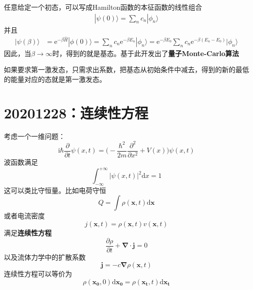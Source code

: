 \documentclass[12pt]{article}
\begin{document}
    任意给定一个初态，可以写成Hamilton函数的本征函数的线性组合
    \begin{align*}
        |\psi(0) \rangle = \sum_n c_n |\phi_n\rangle
    \end{align*}
    并且
    \begin{align*}
        |\psi(\beta) \rangle &= \mathrm{e}^{-\beta \hat{H}} |\phi(0) \rangle = \sum_n c_n\mathrm{e}^{-\beta E_n}|\phi_n \rangle = \mathrm{e}^{-\beta E_0} \sum_n c_n \mathrm{e}^{-\beta(E_n-E_0)} |\phi_n \rangle
    \end{align*}
    因此，当$\beta \to \infty$时，得到的就是基态。基于此开发出了\textbf{量子Monte-Carlo算法}

    如果要求第一激发态，只需求出系数，把基态从初始条件中减去，得到的新的最低的能量对应的态就是第一激发态。

    \section{20201228：连续性方程}

    考虑一个一维问题：
    \begin{equation*}
        \mathrm{i}\hbar \frac {\partial}{\partial t} \psi(x,t) = \bigg(-\frac {\hbar^2}{2m} \frac {\partial ^2}{\partial x^2} + V(x)\bigg)\psi(x,t)
    \end{equation*}
    波函数满足
    \begin{equation*}
        \int_{-\infty}^{+\infty} |\psi(x,t)|^2 \mathrm{d}x = 1
    \end{equation*}
    这可以类比守恒量。比如电荷守恒
    \begin{equation*}
        Q = \int \rho(\bm{x},t) \mathrm{d}\bm{x}
    \end{equation*}
    或者电流密度
    \begin{equation*}
        j(\bm{x},t) = \rho(\bm{x},t)v(\bm{x},t)
    \end{equation*}
    满足\textbf{连续性方程}
    \begin{equation*}
        \frac{\partial \rho}{\partial t} + \bm{\nabla} \cdot \bm{j} = 0
    \end{equation*}
    以及流体力学中的扩散系数
    \begin{equation*}
        \bm{j} = -c \bm{\nabla}\rho(\bm{x},t)
    \end{equation*}
    连续性方程可以等价为
    \begin{equation*}
        \rho(\bm{x_0},0)\mathrm{d}\bm{x_0} = \rho(\bm{x_t},t)\mathrm{d}\bm{x_t} 
    \end{equation*}
\end{document}
